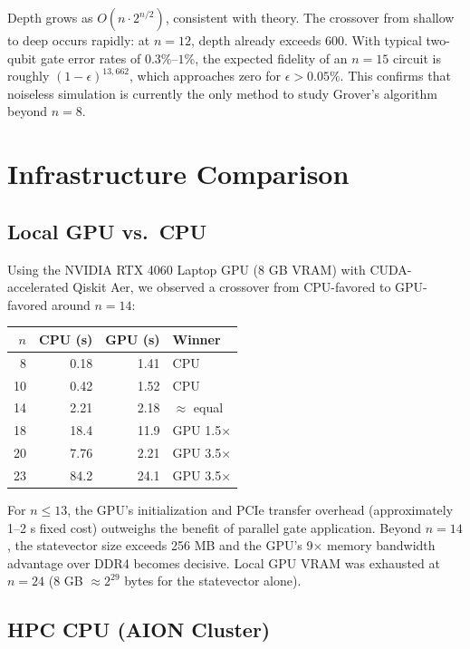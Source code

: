 \documentclass[sigconf, authorversion=true, nonacm=true]{acmart}
\begin{document}
Depth grows as $O(n \cdot 2^{n/2})$, consistent with theory. The crossover from shallow to deep occurs rapidly: at $n=12$, depth already exceeds 600. With typical two-qubit gate error rates of $0.3\%$--$1\%$, the expected fidelity of an $n=15$ circuit is roughly $(1-\epsilon)^{13{,}662}$, which approaches zero for $\epsilon > 0.05\%$. This confirms that noiseless simulation is currently the only method to study Grover's algorithm beyond $n=8$.

\section{Infrastructure Comparison}

\subsection{Local GPU vs.\ CPU}

Using the NVIDIA RTX 4060 Laptop GPU (8 GB VRAM) with CUDA-accelerated Qiskit Aer, we observed a crossover from CPU-favored to GPU-favored around $n=14$:

\begin{center}
\begin{tabular}{rrrl}
\toprule
$n$ & CPU (s) & GPU (s) & Winner \\
\midrule
8  & 0.18  & 1.41  & CPU \\
10 & 0.42  & 1.52  & CPU \\
14 & 2.21  & 2.18  & $\approx$ equal \\
18 & 18.4  & 11.9  & GPU 1.5$\times$ \\
20 & 7.76  & 2.21  & GPU 3.5$\times$ \\
23 & 84.2  & 24.1  & GPU 3.5$\times$ \\
\bottomrule
\end{tabular}
\end{center}

For $n \leq 13$, the GPU's initialization and PCIe transfer overhead (approximately 1--2 s fixed cost) outweighs the benefit of parallel gate application. Beyond $n=14$, the statevector size exceeds 256 MB and the GPU's 9$\times$ memory bandwidth advantage over DDR4 becomes decisive. Local GPU VRAM was exhausted at $n=24$ (8 GB $\approx 2^{29}$ bytes for the statevector alone).

\subsection{HPC CPU (AION Cluster)}
\end{document}

